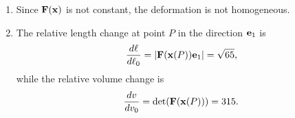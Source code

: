 \begin{exercise}
\begin{svolgimento}
\begin{enumerate}
			\begin{equation}
				[\Fb(\xb)] = \left[\begin{matrix}
					1 + \frac{6x_1}{L} & 0 & 0 \\
					0 & 1 + \frac{2x_3^2}{L^2} & \frac{4x_2x_3}{L^2} \\
					\frac{x_3^2}{L^2} & 0 & 1 + \frac{2x_1x_3}{L^2}
				\end{matrix}\right].
			\end{equation}
			Evaluating $\Fb$ at point $P$, we get
			\begin{equation}
				\Fb(\xb(P)) = 7\eb_1 \otimes \eb_1 + 9\eb_2 \otimes \eb_2 + 4\eb_3 \otimes \eb_1 + 5\eb_3 \otimes \eb_3.
			\end{equation}
			Similarly, for $\Hb(\xb)$, once $\Fb(\xb)$ is calculated, we remember that $\Hb = \Fb - \Ib$:
			\begin{equation}
				\Hb(\xb) = \left(\frac{6x_1}{L}\right)\eb_1 \otimes \eb_1 + \frac{x_3^2}{L^2}\eb_3 \otimes \eb_1 + \left(\frac{2x_3^2}{L^2}\right)\eb_2 \otimes \eb_2 + \frac{4x_2x_3}{L^2}\eb_2 \otimes \eb_3 + \left(\frac{2x_1x_3}{L^2}\right)\eb_3 \otimes \eb_3.
			\end{equation}
			Finally, the right Cauchy-Green tensor is determined as
			\begin{equation}
				\Cb(\xb(P)) = 65\eb_1 \otimes \eb_1 + 20(\eb_1 \otimes \eb_3 + \eb_3 \otimes \eb_2) + 81\eb_2 \otimes \eb_2 + 25\eb_3 \otimes \eb_3,
			\end{equation}
			and the Green-Saint-Venant tensor is
			\begin{equation}
				\Eb_{\rm G}(\xb(P)) = \frac{1}{2}(\Cb(\xb(P)) - \Ib) = \Big( 32\eb_1 \otimes \eb_1 + 10(\eb_1 \otimes \eb_3 + \eb_3 \otimes \eb_2) + 40\eb_2 \otimes \eb_2 + 12\eb_3 \otimes \eb_3 \Big).
			\end{equation}
			\item Since $\Fb(\xb)$ is not constant, the deformation is not homogeneous.
			\item The relative length change at point $P$ in the direction $\mathbf{e}_1$ is
			\begin{equation}
				\frac{d\ell}{d\ell_0} = |\mathbf{F}(\mathbf{x}(P)) \mathbf{e}_1| = \sqrt{65},
			\end{equation}
			while the relative volume change is
			\begin{equation}
				\frac{dv}{dv_0} = \det(\mathbf{F}(\mathbf{x}(P))) = 315.
			\end{equation}
		\end{enumerate}
	\end{svolgimento}
\end{exercise}

